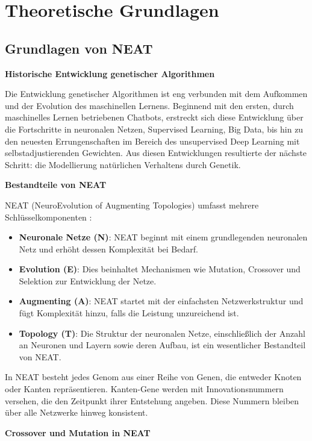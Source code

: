 \chapter{Theoretische Grundlagen}
\label{chapter:2}

\section{Grundlagen von NEAT}

\textbf{Historische Entwicklung genetischer Algorithmen}

Die Entwicklung genetischer Algorithmen ist eng verbunden mit dem Aufkommen und der Evolution des maschinellen Lernens. Beginnend mit den ersten, durch maschinelles Lernen betriebenen Chatbots, erstreckt sich diese Entwicklung über die Fortschritte in neuronalen Netzen, Supervised Learning, Big Data, bis hin zu den neuesten Errungenschaften im Bereich des unsupervised Deep Learning mit selbstadjustierenden Gewichten. Aus diesen Entwicklungen resultierte der nächste Schritt: die Modellierung natürlichen Verhaltens durch Genetik.

\textbf{Bestandteile von NEAT}

NEAT (NeuroEvolution of Augmenting Topologies) umfasst mehrere Schlüsselkomponenten \cite{NEAT}:

\begin{itemize}
	\item \textbf{Neuronale Netze (N)}: NEAT beginnt mit einem grundlegenden neuronalen Netz und erhöht dessen Komplexität bei Bedarf.
	\item \textbf{Evolution (E)}: Dies beinhaltet Mechanismen wie Mutation, Crossover und Selektion zur Entwicklung der Netze.
	\item \textbf{Augmenting (A)}: NEAT startet mit der einfachsten Netzwerkstruktur und fügt Komplexität hinzu, falls die Leistung unzureichend ist.
	\item \textbf{Topology (T)}: Die Struktur der neuronalen Netze, einschließlich der Anzahl an Neuronen und Layern sowie deren Aufbau, ist ein wesentlicher Bestandteil von NEAT.
\end{itemize}

In NEAT besteht jedes Genom aus einer Reihe von Genen, die entweder Knoten oder Kanten repräsentieren. Kanten-Gene werden mit Innovationsnummern versehen, die den Zeitpunkt ihrer Entstehung angeben. Diese Nummern bleiben über alle Netzwerke hinweg konsistent.

\textbf{Crossover und Mutation in NEAT}

